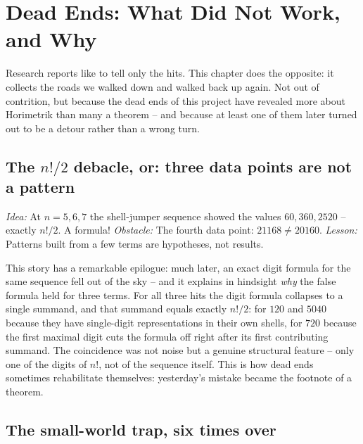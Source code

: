\chapter{Dead Ends: What Did Not Work, and Why}
\label{ch:sackgassen}


Research reports like to tell only the hits. This chapter does the
opposite: it collects the roads we walked down and walked back up
again. Not out of contrition, but because the dead ends of this
project have revealed more about Horimetrik than many a theorem --
and because at least one of them later turned out to be a detour
rather than a wrong turn.

\section{The $n!/2$ debacle, or: three data points are not a pattern}

\begin{sackgasse}
\emph{Idea:} At $n=5,6,7$ the shell-jumper sequence showed the
values $60, 360, 2520$ -- exactly $n!/2$. A formula!
\emph{Obstacle:} The fourth data point: $21168\ne20160$.
\emph{Lesson:} Patterns built from a few terms are hypotheses, not
results.
\end{sackgasse}

This story has a remarkable epilogue: much later, an exact digit
formula for the same sequence fell out of the sky -- and it
explains in hindsight \emph{why} the false formula held for three
terms. For all three hits the digit formula collapses to a single
summand, and that summand equals exactly $n!/2$: for $120$ and
$5040$ because they have single-digit representations in their own
shells, for $720$ because the first maximal digit cuts the formula
off right after its first contributing summand. The coincidence was
not noise but a genuine structural feature -- only one of the
digits of $n!$, not of the sequence itself. This is how dead ends
sometimes rehabilitate themselves: yesterday's mistake became the
footnote of a theorem.

\section{The small-world trap, six times over}

